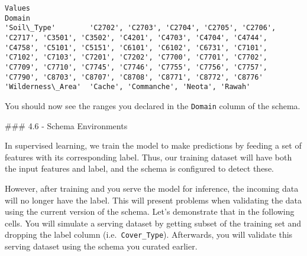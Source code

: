 \documentclass[11pt]{article}
\begin{document}
    
    
    \begin{Verbatim}[commandchars=\\\{\}]
                                                                                                                                                                                                                                                                                                                                                                                   Values
Domain                                                                                                                                                                                                                                                                                                                                                                                   
'Soil\_Type'        'C2702', 'C2703', 'C2704', 'C2705', 'C2706', 'C2717', 'C3501', 'C3502', 'C4201', 'C4703', 'C4704', 'C4744', 'C4758', 'C5101', 'C5151', 'C6101', 'C6102', 'C6731', 'C7101', 'C7102', 'C7103', 'C7201', 'C7202', 'C7700', 'C7701', 'C7702', 'C7709', 'C7710', 'C7745', 'C7746', 'C7755', 'C7756', 'C7757', 'C7790', 'C8703', 'C8707', 'C8708', 'C8771', 'C8772', 'C8776'
'Wilderness\_Area'  'Cache', 'Commanche', 'Neota', 'Rawah'                                                                                                                                                                                                                                                                                                                                
    \end{Verbatim}

    
    You should now see the ranges you declared in the \texttt{Domain} column
of the schema.

    \#\#\# 4.6 - Schema Environments

In supervised learning, we train the model to make predictions by
feeding a set of features with its corresponding label. Thus, our
training dataset will have both the input features and label, and the
schema is configured to detect these.

However, after training and you serve the model for inference, the
incoming data will no longer have the label. This will present problems
when validating the data using the current version of the schema. Let's
demonstrate that in the following cells. You will simulate a serving
dataset by getting subset of the training set and dropping the label
column (i.e.~\texttt{Cover\_Type}). Afterwards, you will validate this
serving dataset using the schema you curated earlier.
\end{document}
